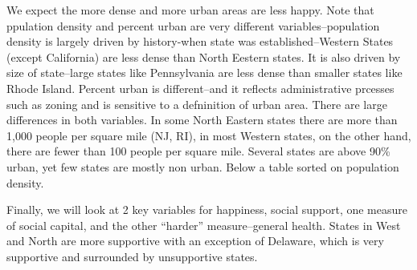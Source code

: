 \documentclass[10pt, letterpaper]{article}
\begin{document}
\begin{spacing}{1.4}
 We 
expect the  more dense and more urban areas are less happy. Note that ppulation
density and percent urban are very different variables--population density is
largely driven by history-when state was established--Western States (except
California) are less dense than North Eestern states. It is also driven by  size
of state--large states like Pennsylvania are less dense than smaller states like
Rhode Island. Percent urban is different--and it reflects administrative
prcesses such as zoning and is sensitive to a defninition of urban area. There are large differences in both
variables. In some North Eastern states there are more than 1,000 people per
square mile (NJ, RI), in most Western states, on the other hand, there are fewer
than 100 people per square mile. Several states are above 90\% urban, yet few
states are mostly non urban. Below a table sorted on population density.

Finally, we will look at 2 key variables for happiness, social support, one
measure of social capital, and the other ``harder'' measure--general
health. States in West and North are more supportive with an exception of
Delaware, which is very supportive and surrounded by unsupportive states.



\end{spacing}
\end{document}
